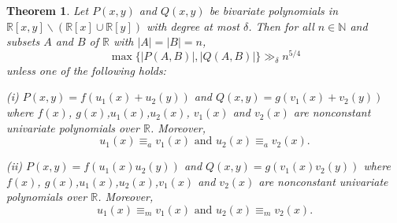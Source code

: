 \documentclass[12pt,reqno]{amsart}
\numberwithin{equation}{section}
\newtheorem{theorem}{Theorem}[section]
\begin{document}
\begin{theorem}\label{thm:jrt1} Let $P(x, y)$ and $Q(x, y)$ be bivariate polynomials in $\mathbb{R}[x, y] \backslash(\mathbb{R}[x] \cup\mathbb{R}[y])$ with degree at most $\delta $. Then for all $n \in \mathbb{N}$ and subsets $A$ and $B$ of $\mathbb{R}$ with $|A|=|B|=n$,
$$
\max \{|P(A, B)|,|Q(A, B)|\} \gg_{\delta} n^{5 / 4}
$$
unless one of the following holds:

(i) $P(x, y)=f(u_{1}(x)+u_{2}(y))$ and $Q(x, y)=g(v_{1}(x)+v_{2}(y))$ where $f(x)$, $g(x)$,$u_{1}(x)$,$u_{2}(x)$, $v_{1}(x)$ and $v_{2}(x)$ are nonconstant univariate polynomials over $\mathbb{R}$. Moreover, $$u_{1}(x)\equiv_{a}v_{1}(x)\text{~and~}u_{2}(x)\equiv_{a}v_{2}(x).$$

(ii) $P(x, y)=f(u_{1}(x)u_{2}(y))$ and $Q(x, y)=g(v_{1}(x) v_{2}(y))$ where  $f(x)$, $g(x)$,$u_{1}(x)$,$u_{2}(x)$,$v_{1}(x)$ and $v_{2}(x)$ are nonconstant univariate polynomials over $\mathbb{R}$. Moreover, $$u_{1}(x)\equiv_{m}v_{1}(x)\text{~and~}u_{2}(x)\equiv_{m}v_{2}(x).$$
\end{theorem}
\end{document}
